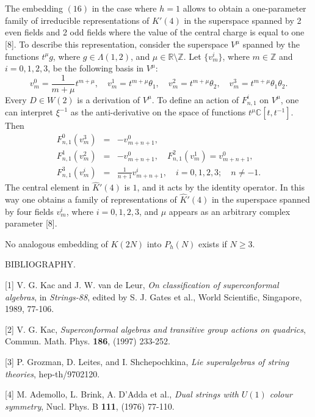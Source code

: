 \documentclass[a4paper,a4paper]{article}
\begin{document}
The embedding $(16)$ in the case where $h = 1$
allows to obtain a one-parameter family of irreducible
representations of $\hat{K}'(4)$
in the superspace spanned by 2 even fields and 2 odd fields
where the value of the central charge is equal to one [8].
To describe this representation,  consider
the superspace $V^{\mu}$ spanned by the functions $t^{\mu}g$,
where $g\in \Lambda (1, 2)$, and $\mu \in \mathbb R \setminus\mathbb Z$.
Let $\lbrace v_m^i\rbrace$, where ${m\in \mathbb Z}$ and $i = 0, 1, 2, 3$,
be the following basis in $V^{\mu}$:
\begin{equation}
v_m^0 = \frac {1} {m + \mu}t^{m + \mu}, \quad
v_m^1 = t^{m + \mu}\theta_1,\quad
v_m^2 = t^{m + \mu}\theta_2, \quad
v_m^{3} = t^{m + \mu}\theta_1\theta_2. 
\end{equation}
Every $D \in W(2)$ is  a derivation of $V^{\mu}$.
To define an action of $F^i_{n,1}$ on  $V^{\mu}$, one can interpret
$\xi^{-1}$ as the anti-derivative 
on the space of functions $t^\mu\mathbb C [t, t^{-1}]$.  Then 
\begin{eqnarray}
F^0_{n,1}(v_m^3) &=& - v_{m+n+1}^0, \nonumber\\
F^1_{n,1}(v_m^2) &=& - v_{m+n+1}^0,\quad 
F^2_{n,1}(v_m^1) =  v_{m+n+1}^0, \\
F^3_{n,1}(v_m^i) &=& \frac {1} {n+1} v_{m+n+1}^i, \quad i = 0, 1, 2, 3; 
\quad n\not= -1.\nonumber
\end{eqnarray}
The central element in $\hat{K}'(4)$ is $1$, and it acts by the identity 
operator. 
In this way one obtains a family of representations of 
$\hat{K}'(4)$
in the superspace spanned by four fields $v_m^i$, where $i = 0, 1, 2, 3$,
and $\mu$ appears as an
arbitrary complex parameter [8].

No analogous embedding of  $K(2N)$ into $P_h(N)$
exists if $N\geq 3$.

\vskip 0.2in


BIBLIOGRAPHY.

\vskip 0.1in

[1] V. G. Kac and J. W. van de Leur,
{\it On classification of superconformal algebras}, 
in {\it Strings-88}, edited by S. J. Gates  et al.,
World Scientific, Singapore, 1989,  77-106.

[2] V. G. Kac,
{\it Superconformal algebras and transitive group actions on quadrics},
Commun. Math. Phys. {\bf 186}, (1997) 233-252.

[3] P. Grozman, D. Leites, and I. Shchepochkina,
{\it Lie superalgebras of string theories},
hep-th/9702120.

[4] M. Ademollo, L. Brink, A. D'Adda  et al.,
{\it Dual strings with $U(1)$ colour symmetry}, 
Nucl. Phys. B {\bf 111}, (1976) 77-110.
\end{document}
